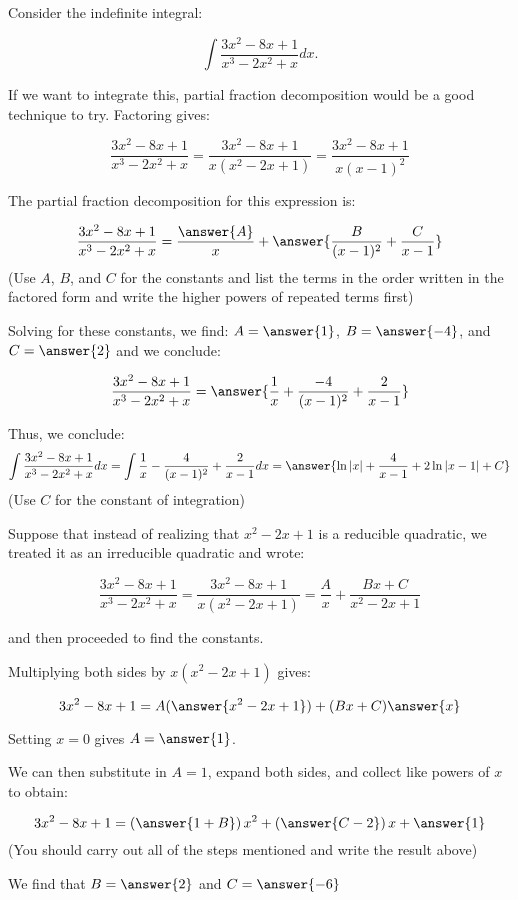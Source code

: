 \documentclass{ximera}
\author{Jim Talamo}
\begin{document}
\begin{exercise}
Consider the indefinite integral: 

\[
\int \frac{3x^2-8x+1}{x^3-2x^2+x} dx.
\]

If we want to integrate this, partial fraction decomposition would be a good technique to try.  Factoring gives:

\[
\frac{3x^2-8x+1}{x^3-2x^2+x}  =\frac{3x^2-8x+1}{x(x^2-2x+1)} =\frac{3x^2-8x+1}{x(x-1)^2} 
\]  

The partial fraction decomposition for this expression is:

\[
\frac{3x^2-8x+1}{x^3-2x^2+x}= \frac{\answer{A}}{x}+\answer{\frac{B}{(x-1)^2}+\frac{C}{x-1}}
\]
(Use $A$, $B$, and $C$ for the constants and list the terms in the order written in the factored form and write the higher powers of repeated terms first)

Solving for these constants, we find: $A = \answer{1}$, $B=\answer{-4}$, and $C=\answer{2}$ and we conclude:

\[
\frac{3x^2-8x+1}{x^3-2x^2+x}= \answer{\frac{1}{x}+\frac{-4}{(x-1)^2}+\frac{2}{x-1}}
\]

Thus, we conclude:
\[
\int \frac{3x^2-8x+1}{x^3-2x^2+x} dx = \int \frac{1}{x}-\frac{4}{(x-1)^2}+\frac{2}{x-1} dx = \answer{\ln|x|+\frac{4}{x-1}+2\ln|x-1| +C}
\]
(Use $C$ for the constant of integration)


\begin{exercise}
Suppose that instead of realizing that $x^2-2x+1$ is a reducible quadratic, we treated it as an irreducible quadratic and wrote:


\[
\frac{3x^2-8x+1}{x^3-2x^2+x}  =\frac{3x^2-8x+1}{x(x^2-2x+1)} =\frac{A}{x}+\frac{Bx+C}{x^2-2x+1} 
\]  

and then proceeded to find the constants.

Multiplying both sides by $x(x^2-2x+1)$ gives:

\[
3x^2-8x+1 = A(\answer{x^2-2x+1})+(Bx+C)\answer{x}
\]  

\begin{exercise}
Setting $x=0$ gives $A=\answer{1}$.

We can then substitute in $A=1$, expand both sides, and collect like powers of $x$ to obtain:

\[
3x^2-8x+1 = \left(\answer{1+B}\right)x^2+\left(\answer{C-2}\right)x+\answer{1}
\]
(You should carry out all of the steps mentioned and write the result above)

We find that $B=\answer{2}$ and $C=\answer{-6}$


\end{exercise}
\end{exercise}
\end{exercise}
\end{document}
